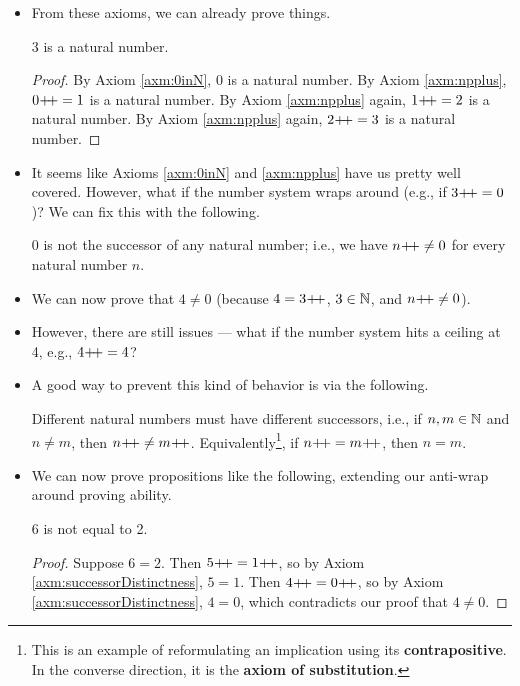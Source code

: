 \documentclass[../main.tex]{subfiles}
\begin{document}
\begin{itemize}
\begin{defn}
    \end{defn}
    \item From these axioms, we can already prove things.
    \begin{prop}
        3 is a natural number.
        \begin{proof}
            By Axiom \ref{axm:0inN}, 0 is a natural number. By Axiom \ref{axm:npplus}, $0\hspace{-0.7mm}+\hspace{-1.5mm}+=1$ is a natural number. By Axiom \ref{axm:npplus} again, $1\hspace{-0.7mm}+\hspace{-1.5mm}+=2$ is a natural number. By Axiom \ref{axm:npplus} again, $2\hspace{-0.7mm}+\hspace{-1.5mm}+=3$ is a natural number.
        \end{proof}
    \end{prop}
    \item It seems like Axioms \ref{axm:0inN} and \ref{axm:npplus} have us pretty well covered. However, what if the number system wraps around (e.g., if $3\hspace{-0.7mm}+\hspace{-1.5mm}+=0$)? We can fix this with the following.
    \begin{axm}
        0 is not the successor of any natural number; i.e., we have $n\hspace{-0.7mm}+\hspace{-1.5mm}+\neq 0$ for every natural number $n$.
    \end{axm}
    \item We can now prove that $4\neq 0$ (because $4=3\hspace{-0.7mm}+\hspace{-1.5mm}+$, $3\in\mathbb{N}$, and $n\hspace{-0.7mm}+\hspace{-1.5mm}+\neq 0$).
    \item However, there are still issues --- what if the number system hits a ceiling at 4, e.g., $4\hspace{-0.7mm}+\hspace{-1.5mm}+=4$?
    \item A good way to prevent this kind of behavior is via the following.
    \begin{axm}\label{axm:successorDistinctness}
        Different natural numbers must have different successors, i.e., if $n,m\in\mathbb{N}$ and $n\neq m$, then $n\hspace{-0.7mm}+\hspace{-1.5mm}+\neq m\hspace{-0.7mm}+\hspace{-1.5mm}+$. Equivalently\footnote{This is an example of reformulating an implication using its \textbf{contrapositive}. In the converse direction, it is the \textbf{axiom of substitution}.}, if $n\hspace{-0.7mm}+\hspace{-1.5mm}+=m\hspace{-0.7mm}+\hspace{-1.5mm}+$, then $n=m$.
    \end{axm}
    \item We can now prove propositions like the following, extending our anti-wrap around proving ability.
    \begin{prop}
        6 is not equal to 2.
        \begin{proof}
            Suppose $6=2$. Then $5\hspace{-0.7mm}+\hspace{-1.5mm}+=1\hspace{-0.7mm}+\hspace{-1.5mm}+$, so by Axiom \ref{axm:successorDistinctness}, $5=1$. Then $4\hspace{-0.7mm}+\hspace{-1.5mm}+=0\hspace{-0.7mm}+\hspace{-1.5mm}+$, so by Axiom \ref{axm:successorDistinctness}, $4=0$, which contradicts our proof that $4\neq 0$.
        \end{proof}
    \end{prop}
\end{itemize}
\end{document}
